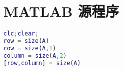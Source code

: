 \documentclass[a4paper,12pt]{article}
\theoremstyle{plain}
\begin{document}
%



{} %


%  

%



%
%
%
%
%



\section*{MATLAB 源程序}
\begin{lstlisting}[language=matlab]
clc;clear;
row = size(A)
row = size(A,1)
column = size(A,2)
[row,column] = size(A)
\end{lstlisting}
\end{document}
